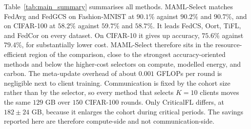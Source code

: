 \documentclass[journal]{IEEEtran}
\newcommand{\revision}[1]{#1}
\begin{document}
\revision{Table~\ref{tab:main_summary} summarises all methods. MAML-Select matches FedAvg and FedGCS on Fashion-MNIST at $90.1\%$ against $90.2\%$ and $90.7\%$, and on CIFAR-100 at $58.2\%$ against $59.7\%$ and $58.7\%$. It leads FedCS, Oort, TiFL, and FedCor on every dataset. On CIFAR-10 it gives up accuracy, $75.6\%$ against $79.4\%$, for substantially lower cost. MAML-Select therefore sits in the resource-efficient region of the comparison, close to the strongest accuracy-oriented methods and below the higher-cost selectors on compute, modelled energy, and carbon. The meta-update overhead of about $0.001$ GFLOPs per round is negligible next to client training. Communication is fixed by the cohort size rather than by the selector, so every method that selects $K=10$ clients moves the same $129$ GB over $150$ CIFAR-100 rounds. Only CriticalFL differs, at $182 \pm 24$ GB, because it enlarges the cohort during critical periods. The savings reported here are therefore compute-side and not communication-side.}
\end{document}
